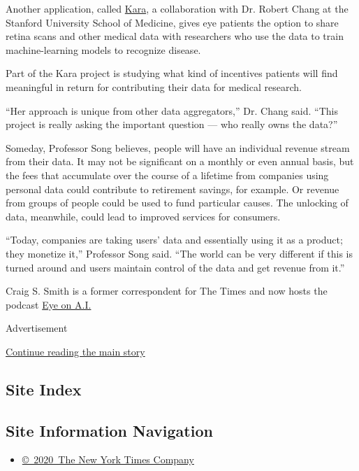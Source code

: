 Another application, called \href{https://kara.cloud/\#/}{Kara}, a
collaboration with Dr. Robert Chang at the Stanford University School of
Medicine, gives eye patients the option to share retina scans and other
medical data with researchers who use the data to train machine-learning
models to recognize disease.

Part of the Kara project is studying what kind of incentives patients
will find meaningful in return for contributing their data for medical
research.

``Her approach is unique from other data aggregators,'' Dr. Chang said.
``This project is really asking the important question --- who really
owns the data?''

Someday, Professor Song believes, people will have an individual revenue
stream from their data. It may not be significant on a monthly or even
annual basis, but the fees that accumulate over the course of a lifetime
from companies using personal data could contribute to retirement
savings, for example. Or revenue from groups of people could be used to
fund particular causes. The unlocking of data, meanwhile, could lead to
improved services for consumers.

``Today, companies are taking users' data and essentially using it as a
product; they monetize it,'' Professor Song said. ``The world can be
very different if this is turned around and users maintain control of
the data and get revenue from it.''

Craig S. Smith is a former correspondent for The Times and now hosts the
podcast \href{https://www.eye-on.ai}{Eye on A.I.}

Advertisement

\protect\hyperlink{after-bottom}{Continue reading the main story}

\hypertarget{site-index}{%
\subsection{Site Index}\label{site-index}}

\hypertarget{site-information-navigation}{%
\subsection{Site Information
Navigation}\label{site-information-navigation}}

\begin{itemize}
\tightlist
\item
  \href{https://help.nytimes.com/hc/en-us/articles/115014792127-Copyright-notice}{©~2020~The
  New York Times Company}
\end{itemize}


